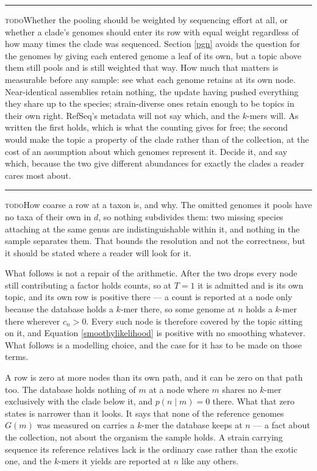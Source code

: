 \documentclass[pdflatex,sn-vancouver-num]{sn-jnl}
\newif\ifshowtodos \showtodostrue
\newcommand{\todo}[1]{%
  \ifshowtodos
    \par\addvspace{0.7\baselineskip}%
    \begin{list}{}{%
      \setlength{\leftmargin}{1.5em}%
      \setlength{\rightmargin}{1.5em}%
      \setlength{\topsep}{0pt}%
      \setlength{\partopsep}{0pt}%
      \setlength{\parsep}{0.5\baselineskip}%
      \setlength{\itemsep}{0pt}%
    }%
    \item[]\footnotesize\color{black!70}%
      \textcolor{orange!65!black}{\rule[-0.2ex]{2pt}{1.15ex}}\hspace{0.55em}%
      \textcolor{orange!65!black}{\textsc{todo}}\hspace{0.6em}\ignorespaces#1%
    \end{list}%
    \addvspace{0.7\baselineskip}%
  \fi%
}
\begin{document}
    \todo{Whether the pooling should be weighted by sequencing effort at all, or whether a clade's
    genomes should enter its row with equal weight regardless of how many times the clade was
    sequenced. Section \ref{pgn} avoids the question for the genomes by giving each entered genome
    a leaf of its own, but a topic above them still pools and is still weighted that way. How much that
    matters is measurable before any sample: see what each genome retains at its own node.
    Near-identical assemblies retain nothing, the update having pushed everything they share up to
    the species; strain-diverse ones retain enough to be topics in their own right. RefSeq's metadata
    will not say which, and the $k$-mers will. As written the first holds, which is what the counting gives for free; the second
    would make the topic a property of the clade rather than of the collection, at the cost of an
    assumption about which genomes represent it. Decide it, and say which, because the two give
    different abundances for exactly the clades a reader cares most about.}

    \todo{How coarse a row at a taxon is, and why. The omitted genomes it pools have no taxa
    of their own in $d$, so nothing subdivides them: two missing species attaching at the same genus
    are indistinguishable within it, and nothing in the sample separates them. That bounds the resolution and not the correctness, but it should be stated where
    a reader will look for it.}

    What follows is not a repair of the arithmetic. After the two drops every node still contributing
    a factor holds counts, so at $T = 1$ it is admitted and is its own topic, and its own row is
    positive there --- a count is reported at a node only because the database holds a $k$-mer there,
    so some genome at $n$ holds a $k$-mer there wherever $c_n > 0$. Every such node is therefore covered by the topic sitting on
    it, and Equation \eqref{smoothylikelihood} is positive with no smoothing whatever. What follows
    is a modelling choice, and the case for it has to be made on those terms.

    A row is zero at more nodes than its own path, and it can be zero on that path too. The database
    holds nothing of $m$ at a node where $m$ shares no $k$-mer exclusively with the clade below it,
    and $p(n \mid m) = 0$ there. What that zero states is narrower than it looks. It says that none
    of the reference genomes $G(m)$ was measured on carries a $k$-mer the database keeps at $n$ ---
    a fact about the collection, not about the organism the sample holds. A strain carrying sequence
    its reference relatives lack is the ordinary case rather than the exotic one, and the $k$-mers it
    yields are reported at $n$ like any others.
\end{document}
